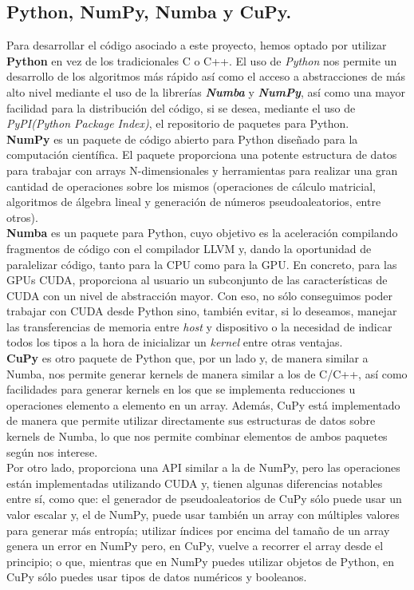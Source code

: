 \subsection{Python, NumPy, Numba y CuPy.}
Para desarrollar el código asociado a este proyecto, hemos optado por utilizar \textbf{Python} en vez de los tradicionales C o C++. El uso de \textit{Python} nos permite un desarrollo de los algoritmos más rápido así como el acceso a abstracciones de más alto nivel mediante el uso de la librerías \textbf{\textit{Numba}} y \textbf{\textit{NumPy}},  así como una mayor facilidad para la distribución del código, si se desea, mediante el uso de \textit{PyPI(Python Package Index)}, el repositorio de paquetes para Python. \\

\textbf{NumPy} \cite{numpy} es un paquete de código abierto para Python diseñado para la computación científica. El paquete proporciona una potente estructura de datos para trabajar con arrays N-dimensionales y herramientas para realizar una gran cantidad de operaciones sobre los mismos (operaciones de cálculo matricial, algoritmos de álgebra lineal y generación de números pseudoaleatorios, entre otros).\\

\textbf{Numba} \cite{numba} es un paquete para Python, cuyo objetivo es la aceleración compilando fragmentos de código con el compilador LLVM y, dando la oportunidad de paralelizar código, tanto para la CPU como para la GPU. En concreto, para las GPUs CUDA, proporciona al usuario un subconjunto de las características de CUDA con un nivel de abstracción mayor. Con eso, no sólo conseguimos poder trabajar con CUDA desde Python sino, también evitar, si lo deseamos, manejar las transferencias de memoria entre \textit{host} y dispositivo o la necesidad de indicar todos los tipos a la hora de inicializar un \textit{kernel} entre otras ventajas.\\

\textbf{CuPy} \cite{cupy} es otro paquete de Python que, por un lado y, de manera similar a Numba, nos permite generar kernels de manera similar a los de C/C++, así como facilidades para generar kernels en los que se implementa reducciones u operaciones elemento a elemento en un array. Además, CuPy está implementado de manera que permite utilizar directamente sus estructuras de datos sobre kernels de Numba, lo que nos permite combinar elementos de ambos paquetes según nos interese. \\

Por otro lado, proporciona una API similar a la de NumPy, pero las operaciones están implementadas utilizando CUDA y, tienen algunas diferencias notables entre sí, como que: el generador de pseudoaleatorios de CuPy sólo puede usar un valor escalar y, el de NumPy, puede usar también un array con múltiples valores para generar más entropía; utilizar índices por encima del tamaño de un array genera un error en NumPy pero, en CuPy, vuelve a recorrer el array desde el principio; o que, mientras que en NumPy puedes utilizar objetos de Python, en CuPy sólo puedes usar tipos de datos numéricos y booleanos.\\

